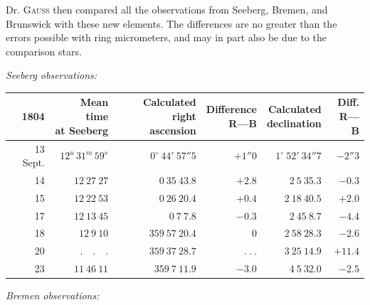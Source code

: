 Dr. \textsc{Gauss} then compared all the observations from Seeberg, Bremen, and Brunswick with these new elements. The differences are no greater than the errors possible with ring micrometers, and may in part also be due to the comparison stars.

\begin{center}
\textit{Seeberg observations:}
\end{center}

\begin{center}
\begingroup\fontsize{8}{10}\selectfont\setlength{\tabcolsep}{3pt}\renewcommand{\arraystretch}{1.12}
\begin{tabular}{r|r|r|r|r|r}
1804 & \shortstack{Mean time\\at Seeberg} & \shortstack{Calculated right\\ascension} & \shortstack{Difference\\R—B} & \shortstack{Calculated\\declination} & \shortstack{Diff.\\R—B} \\ \hline
13 Sept. & $12^{u}\,31^{m}\,59^{s}$ & $0^\circ\ 44'\ 57''5$ & $+1''0$ & $1^\circ\ 52'\ 34''7$ & $-2''3$ \\
14 & $12\ 27\ 27$ & $0\ 35\ 43.8$ & $+2.8$ & $2\ 5\ 35.3$ & $-0.3$ \\
15 & $12\ 22\ 53$ & $0\ 26\ 20.4$ & $+0.4$ & $2\ 18\ 40.5$ & $+2.0$ \\
17 & $12\ 13\ 45$ & $0\ 7\ 7.8$ & $-0.3$ & $2\ 45\ 8.7$ & $-4.4$ \\
18 & $12\ 9\ 10$ & $359\ 57\ 20.4$ & $0$ & $2\ 58\ 28.3$ & $-2.6$ \\
20 & $ .\quad .\quad . $ & $359\ 37\ 28.7$ & $ .\ .\ . $ & $3\ 25\ 14.9$ & $+11.4$ \\
23 & $11\ 46\ 11$ & $359\ 7\ 11.9$ & $-3.0$ & $4\ 5\ 32.0$ & $-2.5$ \\
\end{tabular}\endgroup
\end{center}
%
\begin{center}
\textit{Bremen observations:}
\end{center}

